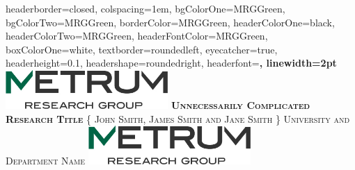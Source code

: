 \documentclass[landscape,a0paper,fontscale=0.5]{baposter} %
\begin{document}
\begin{poster}
{
headerborder=closed, %
colspacing=1em, %
bgColorOne=MRGGreen, %
bgColorTwo=MRGGreen, %
borderColor=MRGGreen, %
headerColorOne=black, %
headerColorTwo=MRGGreen, %
headerFontColor=MRGGreen, %
boxColorOne=white, %
textborder=roundedleft, %
eyecatcher=true, %
headerheight=0.1\textheight, %
headershape=roundedright, %
headerfont=\Large\bf\textsc, %
linewidth=2pt %
}
%
{\includegraphics[height=4em]{graphics/logo.jpg}} %
{\bf\textsc{Unnecessarily Complicated Research Title}\vspace{0.5em}} %
{\textsc{\{ John Smith, James Smith and Jane Smith \} \hspace{12pt} University and Department Name}} %
{\includegraphics[height=4em]{graphics/logo.jpg}} %




\end{poster}
\end{document}
